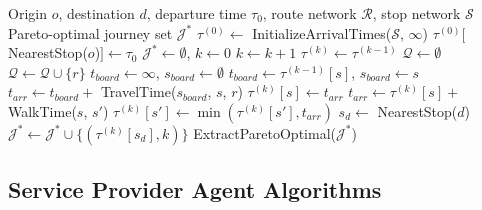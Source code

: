 \begin{algorithm}
\caption{Round-Based Public Transit Optimized Router (RAPTOR)}
\label{alg:raptor}
\begin{algorithmic}[1]
\Require Origin $o$, destination $d$, departure time $\tau_0$, route network $\mathcal{R}$, stop network $\mathcal{S}$
\Ensure Pareto-optimal journey set $\mathcal{J}^*$
\State $\tau^{(0)} \gets$ InitializeArrivalTimes($\mathcal{S}$, $\infty$)
\State $\tau^{(0)}[$ NearestStop($o$)$] \gets \tau_0$
\State $\mathcal{J}^* \gets \emptyset$, $k \gets 0$
\Repeat
    \State $k \gets k + 1$
    \State $\tau^{(k)} \gets \tau^{(k-1)}$ 
    \State $\mathcal{Q} \gets \emptyset$ 
            \State $\mathcal{Q} \gets \mathcal{Q} \cup \{r\}$
        \EndFor
    \EndFor
        \State $t_{board} \gets \infty$, $s_{board} \gets \emptyset$
                \State $t_{board} \gets \tau^{(k-1)}[s]$, $s_{board} \gets s$
            \EndIf
                \State $t_{arr} \gets t_{board} +$ TravelTime($s_{board}$, $s$, $r$)
                    \State $\tau^{(k)}[s] \gets t_{arr}$
                \EndIf
            \EndIf
        \EndFor
    \EndFor
            \State $t_{arr} \gets \tau^{(k)}[s] +$ WalkTime($s$, $s'$)
            \State $\tau^{(k)}[s'] \gets \min(\tau^{(k)}[s'], t_{arr})$
        \EndFor
    \EndFor
    \State $s_d \gets$ NearestStop($d$)
        \State $\mathcal{J}^* \gets \mathcal{J}^* \cup \{(\tau^{(k)}[s_d], k)\}$
    \EndIf
{}
\State \Return ExtractParetoOptimal($\mathcal{J}^*$)
\end{algorithmic}
\end{algorithm}

\subsection{Service Provider Agent Algorithms}
